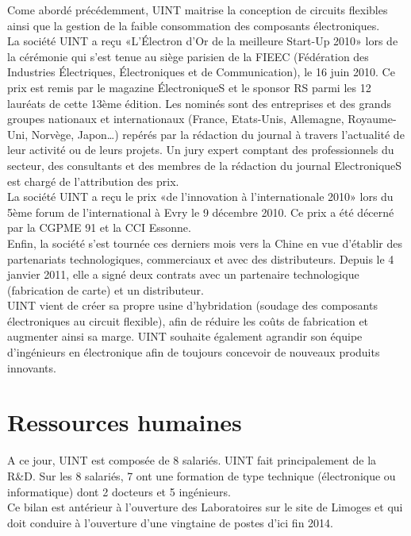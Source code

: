 Come abordé précédemment, UINT maitrise la conception de circuits flexibles ainsi que la gestion de la faible consommation des composants électroniques.\\

La société UINT a reçu «L’Électron d’Or de la meilleure Start-Up 2010» lors de la cérémonie qui s’est tenue au siège parisien de la FIEEC (Fédération des Industries Électriques, Électroniques et de Communication), le 16 juin 2010. Ce prix est remis par le magazine ÉlectroniqueS et le sponsor RS parmi les 12 lauréats de cette 13ème édition. Les nominés sont des entreprises et des grands groupes nationaux et internationaux (France, Etats-Unis, Allemagne, Royaume-Uni, Norvège, Japon…) repérés par la rédaction du journal à travers l’actualité de leur activité ou de leurs projets. Un jury expert comptant des professionnels du secteur, des consultants et des membres de la rédaction du journal ElectroniqueS est chargé de l’attribution des prix.\\

La société UINT a reçu le prix «de l’innovation à l’internationale 2010» lors du 5ème forum de l’international à Evry le 9 décembre 2010. Ce prix a été décerné par la CGPME 91 et la CCI Essonne.\\

Enfin, la société s’est tournée ces derniers mois vers la Chine en vue d’établir des partenariats technologiques, commerciaux et avec des distributeurs. Depuis le 4 janvier 2011, elle a signé deux contrats avec un partenaire technologique (fabrication de carte) et un distributeur.\\

UINT vient de créer sa propre usine d’hybridation (soudage des composants électroniques au circuit flexible), afin de réduire les coûts de fabrication et augmenter ainsi sa marge. UINT souhaite également agrandir son équipe d’ingénieurs en électronique afin de toujours concevoir de nouveaux produits innovants.

\section{Ressources humaines}

A ce jour, UINT est composée de 8 salariés. UINT fait principalement de la R\&D. Sur les 8 salariés, 7 ont une formation de type technique (électronique ou informatique) dont 2 docteurs et 5 ingénieurs.\\

Ce bilan est antérieur à l’ouverture des Laboratoires sur le site de Limoges et qui doit conduire à l’ouverture d’une vingtaine de postes d’ici fin 2014.

